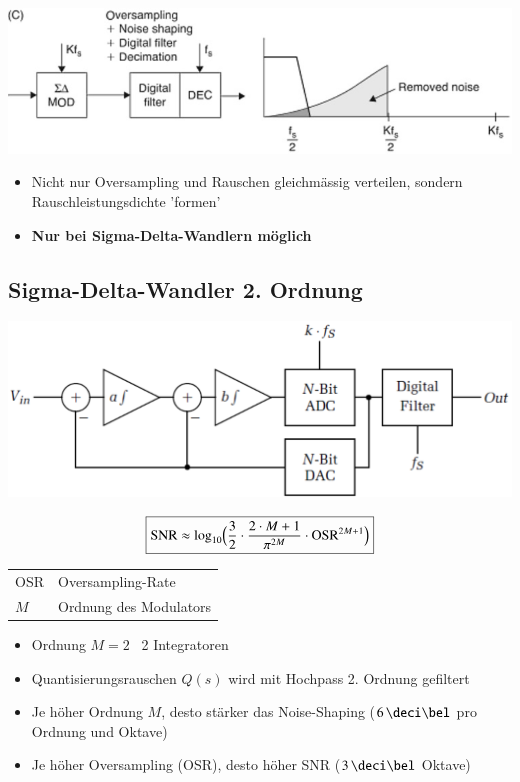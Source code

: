 \begin{minipage}[c]{0.48\columnwidth}
    \includegraphics[width=\columnwidth]{images/rauschen_mit_oversampling_und_noise_shaping.png}
\end{minipage}
\hfill
\begin{minipage}[c]{0.48\columnwidth}
    \begin{itemize}
        \item Nicht nur Oversampling und Rauschen gleichmässig verteilen, sondern Rauschleistungsdichte 'formen'
        \item \textbf{Nur bei Sigma-Delta-Wandlern möglich}
    \end{itemize}
\end{minipage}


\subsection{Sigma-Delta-Wandler 2. Ordnung}

\begin{minipage}[c]{0.48\columnwidth}
    \includegraphics[width=\columnwidth]{images/sigma-delta-wandler_ordnung_2.png}
\end{minipage}
\hfill
\begin{minipage}[c]{0.48\columnwidth}
    $$ \boxed{ \text{SNR} \approx \log_{10} \Bigl( \frac{3}{2} \cdot \frac{2 \cdot M + 1}{\pi^{2M}} \cdot \text{OSR}^{2M+1} \Bigr) } $$
    \begin{tabular}{ll}
        OSR & Oversampling-Rate \\
        $M$ & Ordnung des Modulators
    \end{tabular}
\end{minipage}

\begin{itemize}
    \item Ordnung $M = 2$ \textrightarrow\ 2 Integratoren
    \item Quantisierungsrauschen $Q(s)$ wird mit Hochpass 2. Ordnung gefiltert
    \item Je höher Ordnung $M$, desto stärker das Noise-Shaping ($6 \, \deci \bel$ pro Ordnung und Oktave)
    \item Je höher Oversampling (OSR), desto höher SNR ($3 \, \deci \bel$ Oktave)
\end{itemize}

